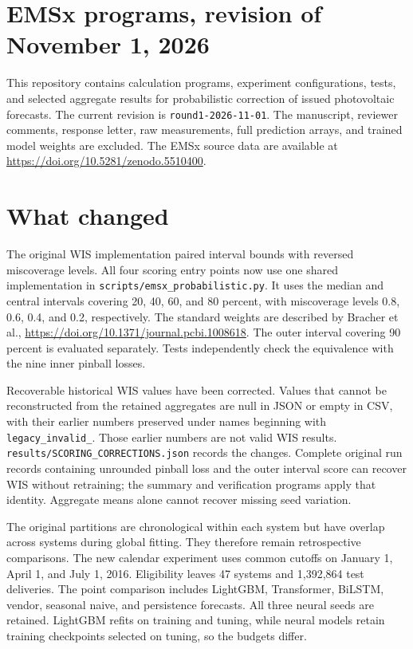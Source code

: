 \section*{EMSx programs, revision of November 1, 2026}

This repository contains calculation programs, experiment configurations, tests,
and selected aggregate results for probabilistic correction of issued photovoltaic
forecasts. The current revision is \texttt{round1-2026-11-01}. The manuscript,
reviewer comments, response letter, raw measurements, full prediction arrays, and
trained model weights are excluded. The EMSx source data are available at
\url{https://doi.org/10.5281/zenodo.5510400}.

\section*{What changed}

The original WIS implementation paired interval bounds with reversed miscoverage
levels. All four scoring entry points now use one shared implementation in
\texttt{scripts/emsx\_probabilistic.py}. It uses the median and central intervals
covering 20, 40, 60, and 80 percent, with miscoverage levels 0.8, 0.6, 0.4, and 0.2,
respectively. The standard weights are described by Bracher et al.,
\url{https://doi.org/10.1371/journal.pcbi.1008618}. The outer interval covering
90 percent is evaluated separately. Tests independently check the equivalence
with the nine inner pinball losses.

Recoverable historical WIS values have been corrected. Values that cannot be
reconstructed from the retained aggregates are null in JSON or empty in CSV,
with their earlier numbers preserved under names beginning with
\texttt{legacy\_invalid\_}. Those earlier numbers are not valid WIS results.
\texttt{results/SCORING\_CORRECTIONS.json} records the changes. Complete original
run records containing unrounded pinball loss and the outer interval score can
recover WIS without retraining; the summary and verification programs apply
that identity. Aggregate means alone cannot recover missing seed variation.

The original partitions are chronological within each system but have overlap
across systems during global fitting. They therefore remain retrospective
comparisons. The new calendar experiment uses common cutoffs on January 1,
April 1, and July 1, 2016. Eligibility leaves 47 systems and 1,392,864 test
deliveries. The point comparison includes LightGBM, Transformer, BiLSTM, vendor,
seasonal naive, and persistence forecasts. All three neural seeds are retained.
LightGBM refits on training and tuning, while neural models retain training
checkpoints selected on tuning, so the budgets differ.

